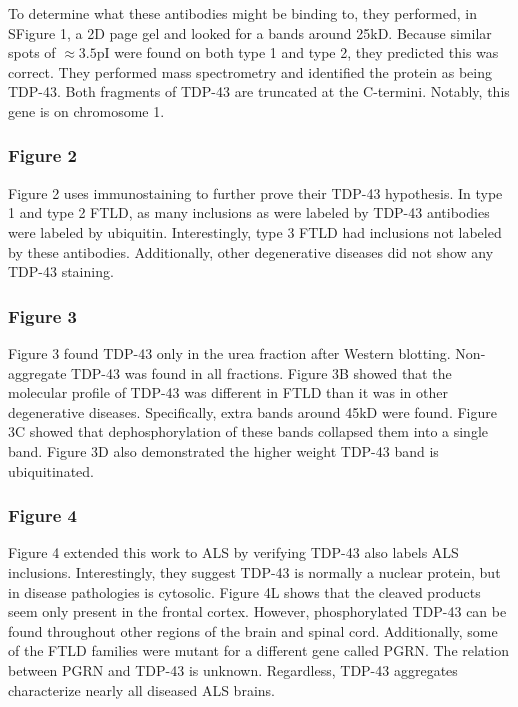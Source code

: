 \documentclass[12pt]{report}
\begin{document}
To determine what these antibodies might be binding to, they performed, in SFigure 1, a 2D page gel and looked for a bands around 25kD. Because similar spots of $\approx 3.5$pI were found on both type 1 and type 2, they predicted this was correct. They performed mass spectrometry and identified the protein as being TDP-43. Both fragments of TDP-43 are truncated at the C-termini. Notably, this gene is on chromosome 1. 

\subsubsection{Figure 2}

Figure 2 uses immunostaining to further prove their TDP-43 hypothesis. In type 1 and type 2 FTLD, as many inclusions as were labeled by TDP-43 antibodies were labeled by ubiquitin. Interestingly, type 3 FTLD had inclusions not labeled by these antibodies. Additionally, other degenerative diseases did not show any TDP-43 staining. 

\subsubsection{Figure 3} 

Figure 3 found TDP-43 only in the urea fraction after Western blotting. Non-aggregate TDP-43 was found in all fractions. Figure 3B showed that the molecular profile of TDP-43 was different in FTLD than it was in other degenerative diseases. Specifically, extra bands around 45kD were found. Figure 3C showed that dephosphorylation of these bands collapsed them into a single band. Figure 3D also demonstrated the higher weight TDP-43 band is ubiquitinated. 

\subsubsection{Figure 4}

Figure 4 extended this work to ALS by verifying TDP-43 also labels ALS inclusions. Interestingly, they suggest TDP-43 is normally a nuclear protein, but in disease pathologies is cytosolic. Figure 4L shows that the cleaved products seem only present in the frontal cortex. However, phosphorylated TDP-43 can be found throughout other regions of the brain and spinal cord. Additionally, some of the FTLD families were mutant for a different gene called PGRN. The relation between PGRN and TDP-43 is unknown. Regardless, TDP-43 aggregates characterize nearly all diseased ALS brains. 
\end{document}
